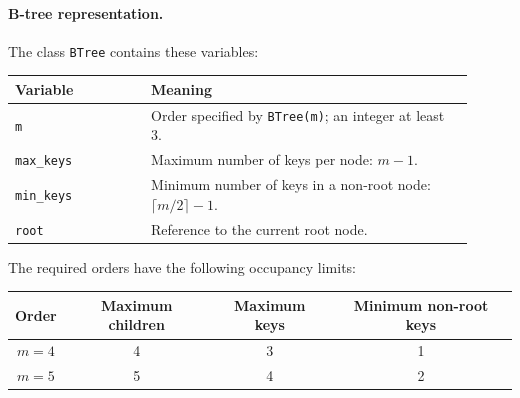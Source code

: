 \documentclass{cisXXX}
\begin{document}
\paragraph{B-tree representation.}
The class \texttt{BTree} contains these variables:
\begin{center}
\begin{tabular}{@{}p{0.27\linewidth}p{0.64\linewidth}@{}}
\toprule
Variable & Meaning \\
\midrule
\texttt{m} & Order specified by \texttt{BTree(m)}; an integer at least 3.\\
\texttt{max\_keys} & Maximum number of keys per node: $m-1$.\\
\texttt{min\_keys} & Minimum number of keys in a non-root node: $\lceil m/2\rceil-1$.\\
\texttt{root} & Reference to the current root node.\\
\bottomrule
\end{tabular}
\end{center}

The required orders have the following occupancy limits:
\begin{center}
\begin{tabular}{@{}cccc@{}}
\toprule
Order & Maximum children & Maximum keys & Minimum non-root keys\\
\midrule
$m=4$ & 4 & 3 & 1\\
$m=5$ & 5 & 4 & 2\\
\bottomrule
\end{tabular}
\end{center}
\end{document}
